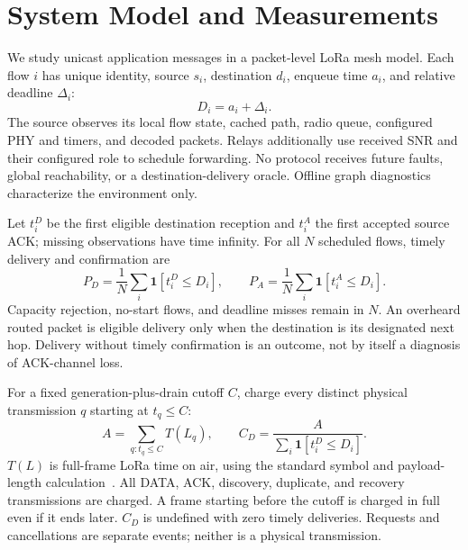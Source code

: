 \section{System Model and Measurements}
\label{sec:model}

We study unicast application messages in a packet-level LoRa mesh model.
Each flow $i$ has unique identity, source $s_i$, destination $d_i$,
enqueue time $a_i$, and relative deadline $\Delta_i$:
\begin{equation}
D_i=a_i+\Delta_i.
\label{eq:deadline}
\end{equation}
The source observes its local flow state, cached path, radio queue,
configured PHY and timers, and decoded packets. Relays additionally use
received SNR and their configured role to schedule forwarding. No protocol
receives future faults, global reachability, or a destination-delivery
oracle. Offline graph diagnostics characterize the environment only.

Let $t_i^{D}$ be the first eligible destination reception and $t_i^{A}$
the first accepted source ACK; missing observations have time infinity.
For all $N$ scheduled flows, timely delivery and confirmation are
\begin{equation}
P_D=\frac{1}{N}\sum_i\mathbf{1}[t_i^{D}\le D_i],\qquad
P_A=\frac{1}{N}\sum_i\mathbf{1}[t_i^{A}\le D_i].
\label{eq:outcomes}
\end{equation}
Capacity rejection, no-start flows, and deadline misses remain in $N$.
An overheard routed packet is eligible delivery only when the destination
is its designated next hop. Delivery without timely confirmation is an
outcome, not by itself a diagnosis of ACK-channel loss.

For a fixed generation-plus-drain cutoff $C$, charge every distinct physical
transmission $q$ starting at $t_q\le C$:
\begin{equation}
A=\sum_{q:t_q\le C}T(L_q),\qquad
C_D=\frac{A}{\sum_i\mathbf{1}[t_i^{D}\le D_i]}.
\label{eq:physical-cost}
\end{equation}
$T(L)$ is full-frame LoRa time on air, using the standard symbol and
payload-length calculation~\cite{augustin2016study}. All DATA, ACK,
discovery, duplicate, and recovery transmissions are charged. A frame
starting before the cutoff is charged in full even if it ends later.
$C_D$ is undefined with zero timely deliveries. Requests and cancellations
are separate events; neither is a physical transmission.

